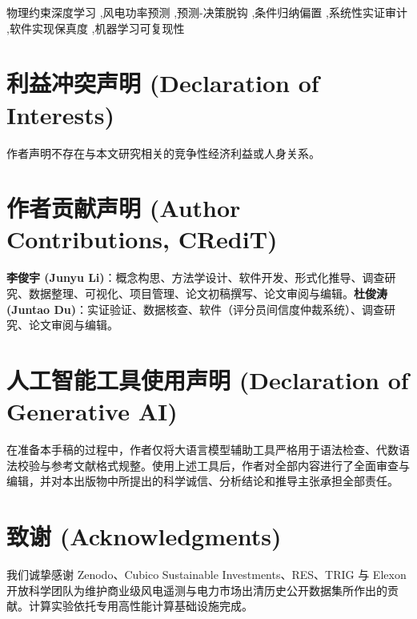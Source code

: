 \documentclass[3p,twocolumn]{elsarticle}
\theoremstyle{definition}
\theoremstyle{remark}
\begin{document}
\begin{frontmatter}
\begin{keyword}
物理约束深度学习 \sep 风电功率预测 \sep 预测-决策脱钩 \sep 条件归纳偏置 \sep 系统性实证审计 \sep 软件实现保真度 \sep 机器学习可复现性
\end{keyword}

\end{frontmatter}













\appendix


\section*{利益冲突声明 (Declaration of Interests)}
作者声明不存在与本文研究相关的竞争性经济利益或人身关系。

\section*{作者贡献声明 (Author Contributions, CRediT)}
\textbf{李俊宇 (Junyu Li)}：概念构思、方法学设计、软件开发、形式化推导、调查研究、数据整理、可视化、项目管理、论文初稿撰写、论文审阅与编辑。\textbf{杜俊涛 (Juntao Du)}：实证验证、数据核查、软件（评分员间信度仲裁系统）、调查研究、论文审阅与编辑。

\section*{人工智能工具使用声明 (Declaration of Generative AI)}
在准备本手稿的过程中，作者仅将大语言模型辅助工具严格用于语法检查、代数语法校验与参考文献格式规整。使用上述工具后，作者对全部内容进行了全面审查与编辑，并对本出版物中所提出的科学诚信、分析结论和推导主张承担全部责任。

\section*{致谢 (Acknowledgments)}
我们诚挚感谢 Zenodo、Cubico Sustainable Investments、RES、TRIG 与 Elexon 开放科学团队为维护商业级风电遥测与电力市场出清历史公开数据集所作出的贡献。计算实验依托专用高性能计算基础设施完成。

\setlength{\bibsep}{2.5pt plus 0.5pt minus 0.5pt}
\small

\end{document}
